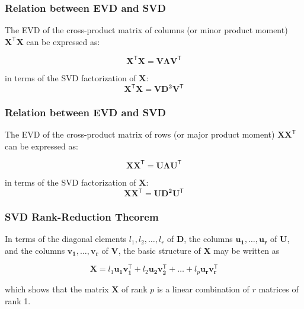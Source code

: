 \documentclass[12pt]{beamer}\usepackage[]{graphicx}\usepackage[]{color}
\begin{document}

\begin{frame}
\frametitle{Relation between EVD and SVD}

The EVD of the cross-product matrix of columns (or minor product moment) 
$\mathbf{X^\mathsf{T} X}$ can be expressed as:

{\large
$$
\mathbf{X^\mathsf{T} X} = \mathbf{V \Lambda V^\mathsf{T}}
$$
}

in terms of the SVD factorization of $\mathbf{X}$:
{\large
$$
\mathbf{X^\mathsf{T} X} = \mathbf{V D^2 V^\mathsf{T}}
$$
}

\end{frame}


\begin{frame}
\frametitle{Relation between EVD and SVD}

The EVD of the cross-product matrix of rows (or major product moment)
$\mathbf{X X^\mathsf{T}}$ can be expressed as:

{\large
$$
\mathbf{X X^\mathsf{T}} = \mathbf{U \Lambda U^\mathsf{T}}
$$
}

in terms of the SVD factorization of $\mathbf{X}$:
{\large
$$
\mathbf{X X^\mathsf{T}} = \mathbf{U D^2 U^\mathsf{T}}
$$
}

\end{frame}


\begin{frame}
\begin{center}
\Huge{}
\end{center}
\end{frame}


\begin{frame}
\frametitle{SVD Rank-Reduction Theorem}

In terms of the diagonal elements $l_1, l_2, \dots, l_r$ of 
$\mathbf{D}$, the columns $\mathbf{u_1}, \dots, \mathbf{u_r}$ of 
$\mathbf{U}$, and the columns $\mathbf{v_1}, \dots, \mathbf{v_r}$ of 
$\mathbf{V}$, the basic structure of $\mathbf{X}$ may be written as

{\large
$$
\mathbf{X} = l_1 \mathbf{u_1 v^\mathsf{T}_1} + l_2 \mathbf{u_2 v^\mathsf{T}_2} 
+ \dots + l_p \mathbf{u_r v^\mathsf{T}_r}
$$
}

which shows that the matrix $\mathbf{X}$ of rank $p$ is a linear combination 
of $r$ matrices of rank 1.

\end{frame}
\end{document}
